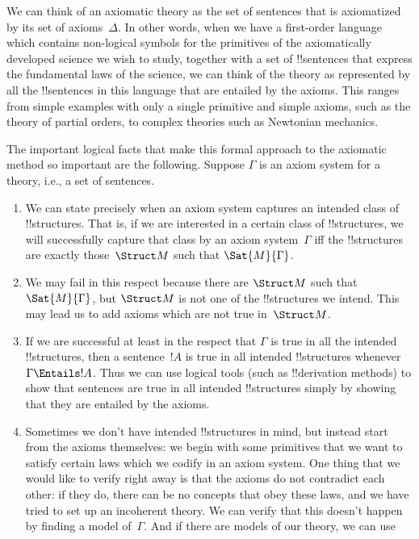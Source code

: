 \documentclass[../../../include/open-logic-section]{subfiles}
\begin{document}
\begin{explain}
We can think of an axiomatic theory as the set of sentences that is
axiomatized by its set of axioms~$\Delta$.  In other words, when we
have a first-order language which contains non-logical symbols for the
primitives of the axiomatically developed science we wish to study,
together with a set of !!{sentence}s that express the fundamental laws
of the science, we can think of the theory as represented by all the
!!{sentence}s in this language that are entailed by the axioms.  This
ranges from simple examples with only a single primitive and
simple axioms, such as the theory of partial orders, to complex
theories such as Newtonian mechanics.

The important logical facts that make this formal approach to the
axiomatic method so important are the following.  Suppose $\Gamma$ is
an axiom system for a theory, i.e., a set of sentences.
\begin{enumerate}
\item We can state precisely when an axiom system captures an intended
  class of !!{structure}s.  That is, if we are interested in a certain
  class of !!{structure}s, we will successfully capture that class by
  an axiom system~$\Gamma$ iff the !!{structure}s are exactly
  those~$\Struct M$ such that $\Sat{M}{\Gamma}$.
\item We may fail in this respect because there are $\Struct M$ such
  that $\Sat{M}{\Gamma}$, but $\Struct M$ is not one of the
  !!{structure}s we intend.  This may lead us to add axioms which are
  not true in~$\Struct M$.
\item If we are successful at least in the respect that $\Gamma$ is
  true in all the intended !!{structure}s, then a sentence~$!A$ is true in
  all intended !!{structure}s whenever $\Gamma \Entails !A$.  Thus we can
  use logical tools (such as !!{derivation} methods) to show that sentences are
  true in all intended !!{structure}s simply by showing that they are
  entailed by the axioms.
\item Sometimes we don't have intended !!{structure}s in mind, but instead
  start from the axioms themselves: we begin with some primitives that
  we want to satisfy certain laws which we codify in an axiom system.
  One thing that we would like to verify right away is that the axioms
  do not contradict each other: if they do, there can be no concepts
  that obey these laws, and we have tried to set up an incoherent
  theory.  We can verify that this doesn't happen by finding a model
  of~$\Gamma$.  And if there are models of our theory, we can use

\end{enumerate}
\end{explain}
\end{document}

